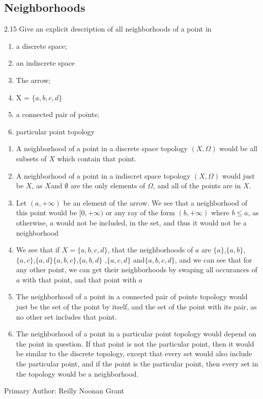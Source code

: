 \subsection{Neighborhoods}
2.15 Give an explicit description of all neighborhoods of a point in
\begin{enumerate}
\item a discrete space;
\item an indiscrete space
\item The arrow;
\item X = $\{a,b,c,d\}$
\item a connected pair of points;
\item particular point topology
\end{enumerate}

\begin{enumerate}
  \item A neighborhood of a point in a discrete space topology $(X,\Omega)$ would
    be all subsets of $X$ which contain that point.
  \item A neighborhood of a point in a indiscret space topology
    $(X,\Omega)$ would just be $X$, as $X$and $\emptyset$ are the only
    elements of $\Omega$, and all of the points are in $X$.
  \item Let $(a,+\infty)$ be an element of the arrow. We see that a
    neighborhood of this point would be $[0,+\infty)$ or any ray of the form
    $(b,+\infty)$ where $b\leq a$, as otherwise, $a$ would not be
    included, in the set, and thus it would not be a neighborhood
  \item We see that if $X = \{a,b,c,d\}$, that the neighborhoods of
    $a$ are
    $\{a\}$,$\{a,b\}$,$\{a,c\}$,$\{a,d\}$$\{a,b,c\}$,$\{a,b,d\}$
    ,$\{a,c,d\}$  and$\{a,b,c,d\}$, and we can see that for any other
    point, we can get their neighborhoods by swaping all occurances of
    $a$ with that point, and that point with $a$
  \item The neighborhood of a point in a connected pair of points
    topology would just be the set of the point by itself, and the set
    of the point with its pair, as no other set includes that point.
  \item The neighborhood of a point in a particular point topology
    would depend on the point in question. If that point is not the
    particular point, then it would be similar to the discrete
    topology, except that every set would also include the particular
    point, and if the point is the particular point, then every set in
    the topology would be a neighborhood.
\end{enumerate}

Primary Author: Reilly Noonan Grant